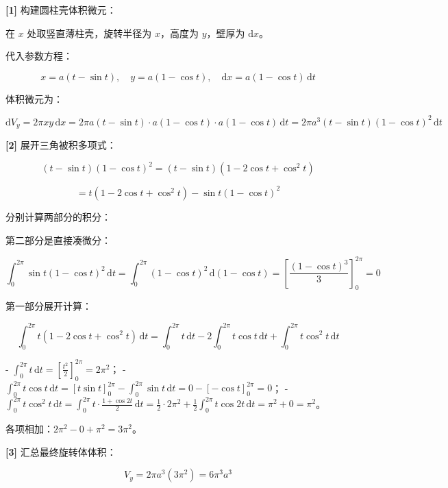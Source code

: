 \documentclass[11pt,a4paper,UTF8]{ctexart}
\begin{document}
\begin{solbox}[分步推导与答题规范]
\textbf{[1]} 构建圆柱壳体积微元：

在 $x$ 处取竖直薄柱壳，旋转半径为 $x$，高度为 $y$，壁厚为 $\mathrm{d}x$。

代入参数方程：


\begin{equation*}
x = a(t - \sin t), \quad y = a(1 - \cos t), \quad \mathrm{d}x = a(1 - \cos t)\,\mathrm{d}t
\end{equation*}


体积微元为：


\begin{equation*}
\mathrm{d}V_y = 2\pi x y\,\mathrm{d}x = 2\pi a(t - \sin t) \cdot a(1 - \cos t) \cdot a(1 - \cos t)\,\mathrm{d}t = 2\pi a^3 (t - \sin t)(1 - \cos t)^2\,\mathrm{d}t
\end{equation*}


\textbf{[2]} 展开三角被积多项式：


\begin{equation*}
(t - \sin t)(1 - \cos t)^2 = (t - \sin t)(1 - 2\cos t + \cos^2 t)
\end{equation*}



\begin{equation*}
= t(1 - 2\cos t + \cos^2 t) - \sin t(1 - \cos t)^2
\end{equation*}


分别计算两部分的积分：

第二部分是直接凑微分：


\begin{equation*}
\int_0^{2\pi} \sin t(1 - \cos t)^2\,\mathrm{d}t = \int_0^{2\pi} (1 - \cos t)^2\,\mathrm{d}(1 - \cos t) = \left[\frac{(1 - \cos t)^3}{3}\right]_0^{2\pi} = 0
\end{equation*}


第一部分展开计算：


\begin{equation*}
\int_0^{2\pi} t(1 - 2\cos t + \cos^2 t)\,\mathrm{d}t = \int_0^{2\pi} t\,\mathrm{d}t - 2\int_0^{2\pi} t\cos t\,\mathrm{d}t + \int_0^{2\pi} t\cos^2 t\,\mathrm{d}t
\end{equation*}


- $\int_0^{2\pi} t\,\mathrm{d}t = \left[\frac{t^2}{2}\right]_0^{2\pi} = 2\pi^2$；
- $\int_0^{2\pi} t\cos t\,\mathrm{d}t = [t\sin t]_0^{2\pi} - \int_0^{2\pi} \sin t\,\mathrm{d}t = 0 - [-\cos t]_0^{2\pi} = 0$；
- $\int_0^{2\pi} t\cos^2 t\,\mathrm{d}t = \int_0^{2\pi} t \cdot \frac{1+\cos 2t}{2}\,\mathrm{d}t = \frac{1}{2} \cdot 2\pi^2 + \frac{1}{2}\int_0^{2\pi} t\cos 2t\,\mathrm{d}t = \pi^2 + 0 = \pi^2$。

各项相加：$2\pi^2 - 0 + \pi^2 = 3\pi^2$。

\textbf{[3]} 汇总最终旋转体体积：


\begin{equation*}
V_y = 2\pi a^3 (3\pi^2) = 6\pi^3 a^3
\end{equation*}

\end{solbox}
\end{document}

